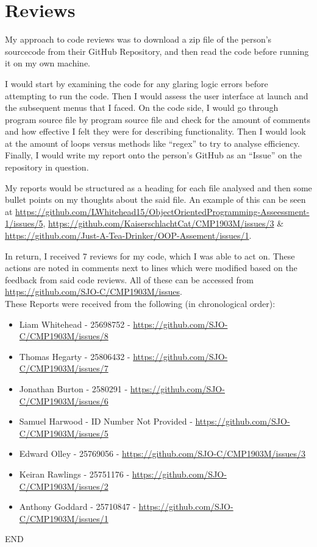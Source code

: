 \documentclass[11pt]{article} %
\begin{document}
\section{Reviews}
My approach to code reviews was to download a zip file of the person's sourcecode from their GitHub Repository, and then read the code before running it on my own machine.\par
I would start by examining the code for any glaring logic errors before attempting to run the code. Then I would assess the user interface at launch and the subsequent menus that I faced. On the code side, I would go through program source file by program source file and check for the amount of comments and how effective I felt they were for describing functionality. Then I would look at the amount of loops versus methods like ``regex'' to try to analyse efficiency. Finally, I would write my report onto the person's GitHub as an ``Issue'' on the repository in question.\par
My reports would be structured as a heading for each file analysed and then some bullet points on my thoughts about the said file. An example of this can be seen at \url{https://github.com/LWhitehead15/ObjectOrientedProgramming-Asseessment-1/issues/5}, \url{https://github.com/KaiserschlachtCat/CMP1903M/issues/3} \& \url{https://github.com/Just-A-Tea-Drinker/OOP-Assement/issues/1}.\par
In return, I received 7 reviews for my code, which I was able to act on. These actions are noted in comments next to lines which were modified based on the feedback from said code reviews. All of these can be accessed from \url{https://github.com/SJO-C/CMP1903M/issues}.\\
These Reports were received from the following (in chronological order):
\begin{itemize}
\item{Liam Whitehead -  25698752 - \url{https://github.com/SJO-C/CMP1903M/issues/8}}
\item{Thomas Hegarty - 25806432 -  \url{https://github.com/SJO-C/CMP1903M/issues/7}}
\item{Jonathan Burton - 2580291 -  \url{https://github.com/SJO-C/CMP1903M/issues/6}}
\item{Samuel Harwood - ID Number Not Provided -  \url{https://github.com/SJO-C/CMP1903M/issues/5}}
\item{Edward Olley - 25769056 -  \url{https://github.com/SJO-C/CMP1903M/issues/3}}
\item{Keiran Rawlings - 25751176 -  \url{https://github.com/SJO-C/CMP1903M/issues/2}}
\item{Anthony Goddard - 25710847 -  \url{https://github.com/SJO-C/CMP1903M/issues/1}}
\end{itemize}
\vfill
\begin{centering}\huge{END}\end{centering}
\end{document}
